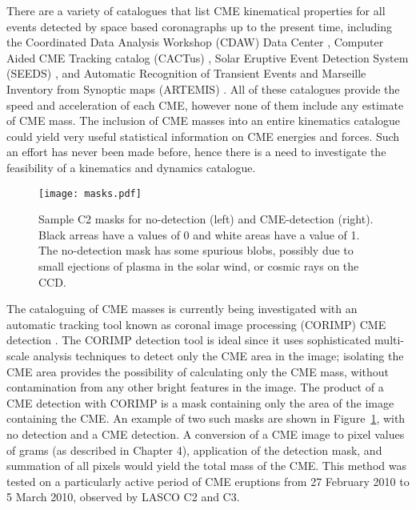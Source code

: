 There are a variety of catalogues that list CME kinematical properties for all events detected by space based coronagraphs up to the present time, including the Coordinated Data Analysis Workshop (CDAW) Data Center \citep{gopal2009b}, Computer Aided CME Tracking catalog (CACTus) \citep{robb2004}, Solar Eruptive Event Detection System (SEEDS) \citep{olmedo2008}, and  Automatic Recognition of Transient Events and Marseille Inventory from Synoptic maps (ARTEMIS) \citep{boursier2009}. All of these catalogues provide the speed and acceleration of each CME, however none of them include any estimate of CME mass. The inclusion of CME masses into an entire kinematics catalogue could yield very useful statistical information on CME energies and forces. Such an effort has never been made before, hence there is a need to investigate the feasibility of a kinematics and dynamics catalogue.
\begin{figure}[t!]
\begin{center}
\texttt{[image: masks.pdf]}
\caption[CORIMP masks]{Sample C2 masks for no-detection (left) and CME-detection (right). Black arreas have a values of 0 and white areas have a value of 1. The no-detection mask has some spurious blobs, possibly due to small ejections of plasma in the solar wind, or cosmic rays on the CCD.}
\label{fig:masks}
\end{center}
\end{figure}

The cataloguing of CME masses is currently being investigated with an automatic tracking tool known as coronal image processing (CORIMP) CME detection \citep{byrne2012}. The CORIMP detection tool is ideal since it uses sophisticated multi-scale analysis techniques to detect only the CME area in the image; isolating the CME area provides the possibility of calculating only the CME mass, without contamination from any other bright features in the image. The product of a CME detection with CORIMP is a mask containing only the area of the image containing the CME. An example of two such masks are shown in Figure~\ref{fig:masks}, with no detection and a CME detection. A conversion of a CME image to pixel values of grams (as described in Chapter 4), application of the detection mask, and summation of all pixels would yield the total mass of the CME. This method was tested on a particularly active period of CME eruptions from 27 February 2010 to 5 March 2010, observed by LASCO C2 and C3. 

